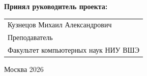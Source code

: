 \begin{titlepage}
\vspace{1em}
{\bf Принял руководитель проекта: \vspace{2mm}}

{
\begin{tabular}{l}
Кузнецов Михаил Александрович\\
Преподаватель\\
Факультет компьютерных наук НИУ ВШЭ 
\end{tabular}}





\vspace{\fill}

\begin{center}
Москва 2026
\end{center}

\end{titlepage}
